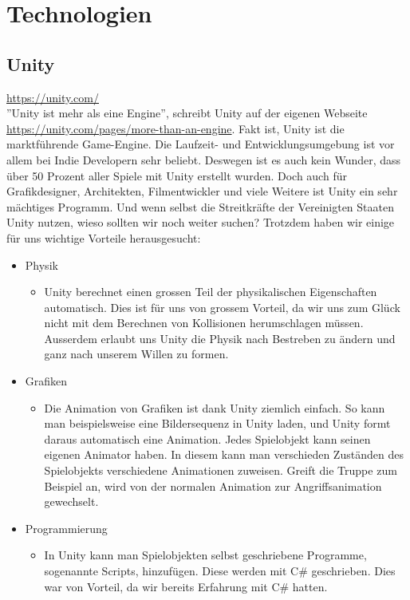 \chapter{Technologien}

\section{Unity}
\url{https://unity.com/}\\
''Unity ist mehr als eine Engine'', schreibt Unity auf der eigenen Webseite \url{https://unity.com/pages/more-than-an-engine}. Fakt ist, Unity ist die marktführende Game-Engine. Die Laufzeit- und Entwicklungsumgebung 
ist vor allem bei \gls{Indie Developer}n sehr beliebt. Deswegen ist es auch kein Wunder, dass über 50 Prozent aller Spiele mit Unity erstellt wurden. 
Doch auch für Grafikdesigner, Architekten, Filmentwickler und viele Weitere ist Unity ein sehr mächtiges Programm. Und wenn selbst die Streitkräfte der Vereinigten Staaten Unity nutzen, wieso sollten wir 
noch weiter suchen? Trotzdem haben wir einige für uns wichtige Vorteile herausgesucht:\\

\begin{itemize}
    \item Physik
    \begin{itemize}
        \item Unity berechnet einen grossen Teil der physikalischen Eigenschaften automatisch. Dies ist für uns von grossem Vorteil, da wir uns zum Glück nicht mit dem Berechnen von Kollisionen herumschlagen müssen.
        Ausserdem erlaubt uns Unity die Physik nach Bestreben zu ändern und ganz nach unserem Willen zu formen.
    \end{itemize}
    \item Grafiken
    \begin{itemize}
        \item Die Animation von Grafiken ist dank Unity ziemlich einfach. So kann man beispielsweise eine Bildersequenz in Unity laden, und Unity formt daraus automatisch eine Animation. Jedes Spielobjekt kann seinen
        eigenen Animator haben. In diesem kann man verschieden Zuständen des Spielobjekts verschiedene Animationen zuweisen. Greift die Truppe zum Beispiel an, wird von der normalen Animation zur Angriffsanimation
        gewechselt.
    \end{itemize}
    \item Programmierung
    \begin{itemize}
        \item In Unity kann man Spielobjekten selbst geschriebene Programme, sogenannte Scripts, hinzufügen. Diese werden mit C\# geschrieben. Dies war von Vorteil, da wir bereits Erfahrung mit C\# hatten. 
    \end{itemize}
\end{itemize}

